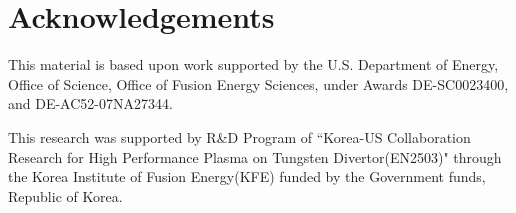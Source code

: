 \section*{Acknowledgements}

This material is based upon work supported by the U.S. Department of Energy, Office of Science, Office of Fusion Energy Sciences,
under Awards 
DE-SC0023400, %
and
DE-AC52-07NA27344.  %

This research was supported by R\&D Program of ``Korea-US Collaboration Research for High Performance Plasma on Tungsten Divertor(EN2503)" through the Korea Institute of Fusion Energy(KFE) funded by the Government funds, Republic of Korea.
